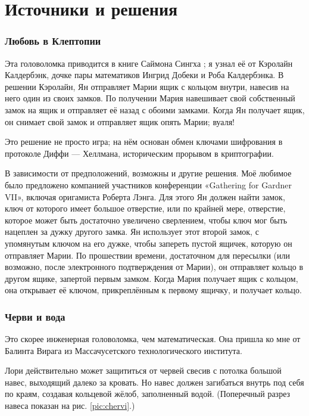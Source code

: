 \section*{Источники и решения}

\subsubsection*{Любовь в Клептопии}

Эта головоломка приводится в книге Саймона Сингха \cite{singh};
я узнал её от Кэролайн Калдербэнк, дочке пары математиков Ингрид Добеки и Роба Калдербэнка.
В решении Кэролайн, Ян отправляет Марии ящик с кольцом внутри, навесив на него один из своих замков.
По получении Мария навешивает свой собственный замок на ящик и отправляет её назад с обоими замками.
Когда Ян получает ящик, он снимает свой замок и отправляет ящик опять Марии; вуаля!

Это решение не просто игра;
на нём основан обмен ключами шифрования в протоколе Диффи — Хеллмана, историческим прорывом в криптографии.

В зависимости от предположений, возможны и другие решения.
Моё любимое было предложено компанией участников конференции
«Ga\-the\-ring for Gardner VII», включая оригамиста Роберта Лэнга.
Для этого Ян должен найти замок, ключ от которого имеет большое отверстие, или по крайней мере, отверстие, которое может быть достаточно увеличено сверлением, чтобы ключ мог быть нацеплен за дужку другого замка.
Ян использует этот второй замок, с упомянутым ключом на его дужке, чтобы запереть пустой ящичек, которую он отправляет Марии.
По прошествии времени, достаточном для пересылки (или возможно, после электронного подтверждения от Марии), он отправляет кольцо в другом ящике, запертой первым замком.
Когда Мария получает ящик с кольцом, она открывает её ключом, прикреплённым к первому ящичку, и получает кольцо.

\subsubsection*{Черви и вода}

Это скорее инженерная головоломка, чем математическая.
Она пришла ко мне от Балинта Вирага из Массачусетского технологического института.

Лори действительно может защититься от червей свесив с потолка большой навес, выходящий далеко за кровать.
Но навес должен загибаться внутрь под себя по краям, создавая кольцевой жёлоб, заполненный водой.
(Поперечный разрез навеса показан на рис. \ref{pic:chervi}.)

